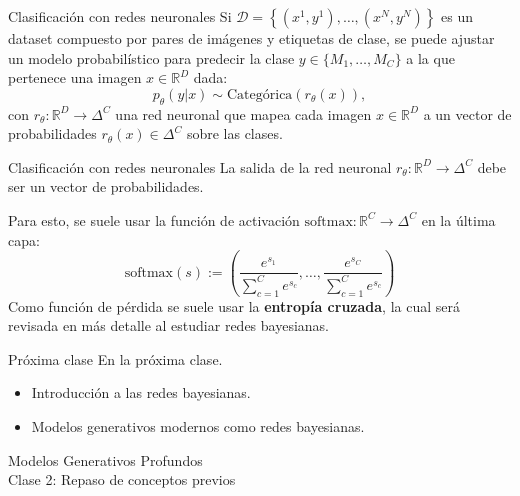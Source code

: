 \documentclass{beamer}
\newcommand{\R}{\mathbb{R}}
\begin{document}
\begin{frame}{Clasificación con redes neuronales}
    Si $\mathcal{D}=\left\{(x^1,y^1),\ldots,(x^N,y^N)\right\}$ es un dataset compuesto por pares de imágenes y etiquetas de clase, se puede ajustar un modelo probabilístico para predecir la clase $y\in\{M_1,\ldots,M_C\}$ a la que pertenece una imagen $x\in\R^D$ dada:
    \begin{equation*}
        p_\theta(y|x)\sim\text{Categórica}(r_\theta(x)),
    \end{equation*}
    con $r_\theta:\R^D\to\Delta^C$ una red neuronal que mapea cada imagen $x\in\R^D$ a un vector de probabilidades $r_\theta(x)\in\Delta^C$ sobre las clases.
\end{frame}

\begin{frame}{Clasificación con redes neuronales}
    La salida de la red neuronal $r_\theta:\R^D\to\Delta^C$ debe ser un vector de probabilidades.

    Para esto, se suele usar la función de activación $\text{softmax}:\R^C\to\Delta^C$ en la última capa:
    \begin{equation*}
        \text{softmax}(s):=\left(\frac{e^{s_1}}{\sum_{c=1}^C e^{s_c}}, \ldots,\frac{e^{s_C}}{\sum_{c=1}^C e^{s_c}}\right)
    \end{equation*}
    Como función de pérdida se suele usar la \textbf{entropía cruzada}, la cual será revisada en más detalle al estudiar redes bayesianas.
\end{frame}

\begin{frame}{Próxima clase}
    En la próxima clase.
    \begin{itemize}
        \item Introducción a las redes bayesianas.
        \item Modelos generativos modernos como redes bayesianas.
    \end{itemize}
\end{frame}

\begin{frame}
    \centering
    \Large{Modelos Generativos Profundos}\\
    \large{Clase 2: Repaso de conceptos previos}
\end{frame}
\end{document}
